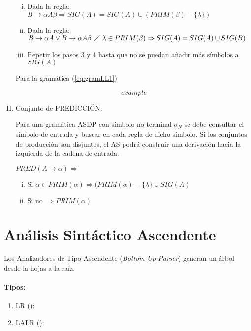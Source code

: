 \begin{enumerate}[I.]
{\begin{enumerate}[i.]
\item Dada la regla: $B \rightarrow \alpha A \beta \Rightarrow SIG(A) = SIG(A) \cup (PRIM(\beta) - \{\lambda\})$

\item Dada la regla: $B \rightarrow \alpha A \vee B \rightarrow \alpha A \beta\ \diagup\ \lambda \in PRIM(\beta) \Rightarrow SIG(A) = SIG(A) \cup SIG(B)$

\item Repetir los pasos 3 y 4 hasta que no se puedan añadir más símbolos a $SIG(A)$

\end{enumerate}

\ejem Para la gramática (\ref{eq:gramLL1})

\begin{equation}
example
\end{equation}
}
\item Conjunto de PREDICCIÓN: {
 Para una gramática ASDP con símbolo no terminal $\sigma_N$ se debe consultar el símbolo de entrada y buscar en cada regla de dicho símbolo. Si los conjuntos de producción son disjuntos, el AS podrá construir una derivación hacia la izquierda de la cadena de entrada. 


\form $PRED(A \rightarrow \alpha) \Rightarrow$

\begin{enumerate}[i.]
\item Si $\alpha \in PRIM(\alpha) \Rightarrow (PRIM(\alpha) - \{\lambda\} \cup SIG(A)$
\item Si no $\Rightarrow PRIM(\alpha)$ 
\end{enumerate}
}
\end{enumerate}

\section{Análisis Sintáctico Ascendente}

 Los Analizadores de Tipo Ascendente (\textit{Bottom-Up-Parser}) generan un árbol desde la hojas a la raíz.

\paragraph*{Tipos:}

\begin{enumerate}

\item LR ():

\item LALR ():

\end{enumerate}


